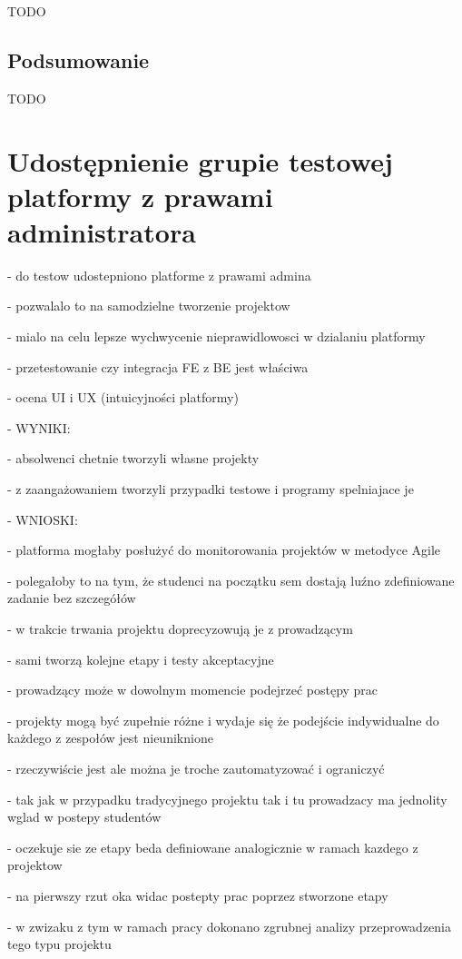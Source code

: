 TODO


\subsection{Podsumowanie}

TODO


\section{Udostępnienie grupie testowej platformy z prawami administratora}

- do testow udostepniono platforme z prawami admina

- pozwalalo to na samodzielne tworzenie projektow

- mialo na celu lepsze wychwycenie nieprawidlowosci w dzialaniu platformy

- przetestowanie czy integracja FE z BE jest właściwa

- ocena UI i UX (intuicyjności platformy)

- WYNIKI:

- absolwenci chetnie tworzyli własne projekty

- z zaangażowaniem tworzyli przypadki testowe i programy spelniajace je

- WNIOSKI:

- platforma mogłaby posłużyć do monitorowania projektów w metodyce Agile

- polegałoby to na tym, że studenci na początku sem dostają luźno zdefiniowane zadanie bez szczegółów

- w trakcie trwania projektu doprecyzowują je z prowadzącym

- sami tworzą kolejne etapy i testy akceptacyjne

- prowadzący może w dowolnym momencie podejrzeć postępy prac

- projekty mogą być zupełnie różne i wydaje się że podejście indywidualne do każdego z zespołów jest nieuniknione

- rzeczywiście jest ale można je troche zautomatyzować i ograniczyć

- tak jak w przypadku tradycyjnego projektu tak i tu prowadzacy ma jednolity wglad w postepy studentów

- oczekuje sie ze etapy beda definiowane analogicznie w ramach kazdego z projektow

- na pierwszy rzut oka widac postepty prac poprzez stworzone etapy

- w zwizaku z tym w ramach pracy dokonano zgrubnej analizy przeprowadzenia tego typu projektu

